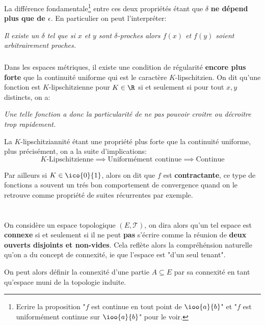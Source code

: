 La différence fondamentale\footnote[2]{Ecrire la proposition "\(f\) est continue en tout point de \(\ioo{a}{b}\)" et "\(f\) est uniformément continue sur \(\ioo{a}{b}\)" pour le voir.} entre ces deux propriétés étant que \(\delta\) \textbf{ne dépend plus que de \(\epsilon\)}. En particulier on peut l'interpréter:
\begin{center}      
   \textit{Il existe un \(\delta\) tel que si \(x\) et \(y\) sont \(\delta\)-proches alors \(f(x)\) et \(f(y)\) soient arbitrairement proches.}
\end{center}
\subsection*{}
Dans les espaces métriques, il existe une condition de régularité \textbf{encore plus forte} que la continuité uniforme qui est le caractère \(K\)-lipschitzien. On dit qu'une fonction est \(K\)-lipschitzienne pour \(K \in \R\) si et seulement si pour tout \(x, y\) distincts, on a:
\begin{center}
   \textit{
      Une telle fonction a donc la particularité de ne pas pouvoir croitre ou décroitre trop rapidement.
   }
\end{center}
La \(K\)-lipschitziannité étant une propriété plus forte que la continuité uniforme, plus précisément, on a la suite d'implications:
\[
   K\text{-Lipschitzienne} \implies \text{Uniformément continue} \implies \text{Continue}
\]


Par ailleurs si \(K \in \ico{0}{1}\), alors on dit que \(f\) est \textbf{contractante}, ce type de fonctions a souvent un trés bon comportement de convergence quand on le retrouve comme propriété de suites récurrentes par exemple.
\chapter*{}
On considère un espace topologique \((E, \mathcal{T})\), on dira alors qu'un tel espace est \textbf{connexe} si et seulement si il ne peut \textbf{pas} s'écrire comme la réunion de \textbf{deux ouverts disjoints et non-vides}. Cela reflète alors la compréhénsion naturelle qu'on a du concept de connexité, ie que l'espace est "d'un seul tenant".\<

On peut alors définir la connexité d'une partie \( A \subseteq E \) par sa connexité en tant qu'espace muni de la topologie induite.
